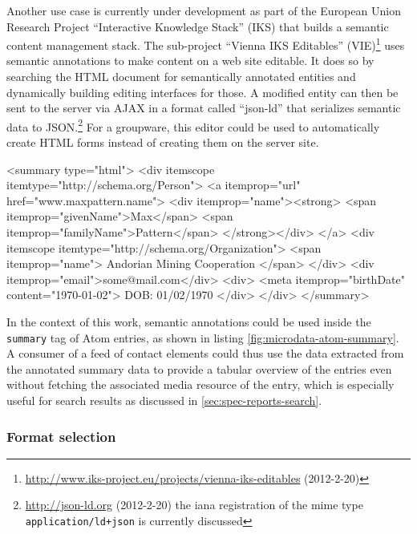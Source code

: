 \documentclass[11pt,a4paper,headsepline,twoside]{scrartcl}		%
\newcommand{\citeurl}[2]{\url{#1} (#2)}
\begin{document}
Another use case is currently under development as part of the European Union
Research Project ``Interactive Knowledge Stack'' (IKS) that builds a semantic
content management stack. The sub-project ``Vienna IKS Editables''
(VIE)\footnote{\citeurl{http://www.iks-project.eu/projects/vienna-iks-editables}{2012-2-20}}
uses semantic annotations to make content on a web site editable. It does so by
searching the HTML document for semantically annotated entities and dynamically
building editing interfaces for those. A modified entity can then be sent to the
server via AJAX in a format called ``json-ld'' that serializes semantic data to
JSON.\footnote{\citeurl{http://json-ld.org}{2012-2-20} the iana registration of
  the mime type \lstinline:application/ld+json: is currently discussed} For a
groupware, this editor could be used to automatically create HTML forms instead
of creating them on the server site.

\begin{anylisting}[label=fig:microdata-atom-summary,
                   language=xml,
                   caption={Microdata used in the summary of an ATOM entry summary (markup not escaped for clarity)}]
<summary type="html">
  <div itemscope itemtype="http://schema.org/Person">
    <a itemprop="url" href="www.maxpattern.name">
      <div itemprop="name"><strong>
        <span itemprop="givenName">Max</span>
        <span itemprop="familyName">Pattern</span>
      </strong></div>
    </a>
    <div itemscope
         itemtype="http://schema.org/Organization">
      <span itemprop="name">
        Andorian Mining Cooperation
      </span>
    </div>
    <div itemprop="email">some@mail.com</div>
    <div>
      <meta itemprop="birthDate" content="1970-01-02">
      DOB: 01/02/1970
    </div>
  </div>
</summary>  
\end{anylisting}

In the context of this work, semantic annotations could be used inside the
\lstinline:summary: tag of Atom entries, as shown in listing
\ref{fig:microdata-atom-summary}. A consumer of a feed of contact elements could
thus use the data extracted from the annotated summary data to provide a tabular
overview of the entries even without fetching the associated media resource of
the entry, which is especially useful for search results as discussed in
\autoref{sec:spec-reports-search}.

\subsubsection{Format selection}
\end{document}
